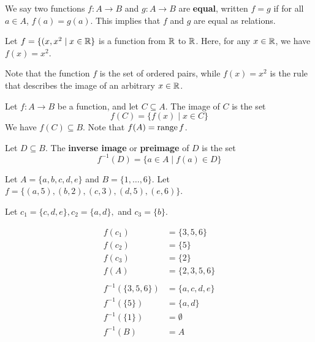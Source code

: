 \documentclass{article}
\begin{document}
  \begin{definition}
    We say two functions $f:A\to B$ and $g: A \to B$ are \textbf{equal}, written $f = g$ if for all $a \in A$, $f(a) = g(a)$. This implies that $f$ and $g$ are equal as relations.
  \end{definition}
  \begin{example}
    Let $f = \{(x, x^2\mid x \in \mathbb{R}\}$ is a function from $\mathbb{R}$ to $\mathbb{R}$. Here, for any $x \in \mathbb{R}$, we have $f(x) = x^2$.

      Note that the function $f$ is the set of ordered pairs, while $f(x) = x^2$ is the rule that describes the image of an arbitrary $x \in \mathbb{R}$.
    \end{example}
    \begin{definition}
      Let $f: A \to B$ be a function, and let $C \subseteq A$. The image of $C$ is the set
      \[
        f(C) = \{f(x) \mid x \in C\}
      \]
      We have $f(C) \subseteq B$.
      Note that $f(A) = \operatorname{\text{range}}{f}$.
    \end{definition}
    \begin{definition}
      Let $D \subseteq B$. The \textbf{inverse image} or \textbf{preimage} of $D$ is the set
      \[
        f^{-1}(D) = \{a \in A \mid f(a) \in D\}
      \]
    \end{definition}
    \begin{example}
      Let $A = \{a, b, c, d, e\}$ and $B = \{1, \dots, 6\}$.
      Let $f = \{(a, 5), (b, 2), (c, 3), (d, 5), (e, 6)\}$.

      Let $c_1 = \{c, d, e\}, c_2 = \{a, d\},$ and $c_3 = \{b\}$.

      \begin{align*}
        f(c_1) &= \{3, 5, 6\}\\
        f(c_2) &= \{5\}\\
        f(c_3) &= \{2\}\\
        f(A) &= \{2, 3, 5, 6\}\\
        \\
        f^{-1}(\{3, 5, 6\}) &= \{a, c, d, e\}\\
        f^{-1}(\{5\}) &= \{a, d\}\\
        f^{-1}(\{1\}) &= \emptyset\\
        f^{-1}(B) &= A\\
      \end{align*}
    \end{example}
\end{document}
